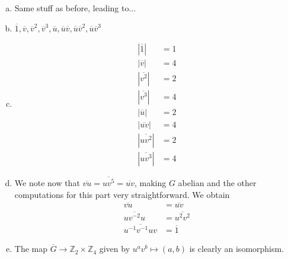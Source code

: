 \documentclass{article}
\newcommand{\ints}{\mathbb{Z}}
\newcommand{\abs}[1]{| #1 |}
\newcommand{\inv}[1]{ {#1}^{-1} }
\renewcommand{\bar}{\overline}
\begin{document}
\subsubsection{}\label{ex1p19}
\begin{enumerate}[(a)]
\item Same stuff as before, leading to...
\item $\bar{1},\bar{v},\bar{v}^2,\bar{v}^3,\bar{u},\bar{u}\bar{v},\bar{u}\bar{v}^2,\bar{u}\bar{v}^3$
\item
\begin{align*}
\abs{\bar{1}} &= 1\\
\abs{\bar{v}} &= 4\\
\abs{\bar{v^2}} &= 2\\
\abs{\bar{v^3}} &= 4\\
\abs{\bar{u}} &= 2\\
\abs{\bar{uv}} &= 4\\
\abs{\bar{uv^2}} &= 2\\
\abs{\bar{uv^3}} &= 4
\end{align*}
\item We note now that $\bar{vu} = \bar{uv^5} = \bar{uv}$, making $G$ abelian and the other computations for this part very straightforward. We obtain
\begin{align*}
\bar{vu} &= \bar{uv}\\
\bar{uv^{-2}u} &= \bar{u^2v^2}\\
\bar{\inv{u}\inv{v}uv} &= \bar{1}
\end{align*}
\item The map $\bar{G} \to \ints_2 \times \ints_4$ given by $u^av^b \mapsto (a,b)$ is clearly an isomorphism.
\end{enumerate}
\end{document}
